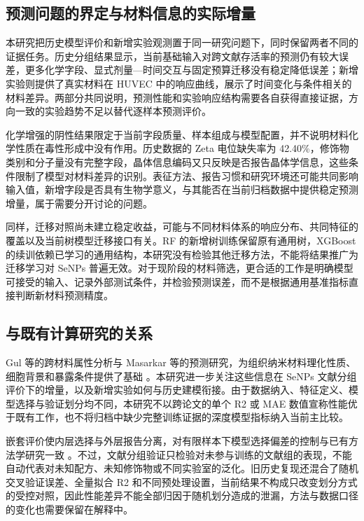 \subsection{预测问题的界定与材料信息的实际增量}

本研究把历史模型评价和新增实验观测置于同一研究问题下，同时保留两者不同的证据任务。历史分组结果显示，当前基础输入对跨文献存活率的预测仍有较大误差，更多化学字段、显式剂量—时间交互与固定预算迁移没有稳定降低误差；新增实验则提供了真实材料在 HUVEC 中的响应曲线，展示了时间变化与条件相关的材料差异。两部分共同说明，预测性能和实验响应结构需要各自获得直接证据，方向一致的实验趋势不足以替代逐样本预测评价。

化学增强的阴性结果限定于当前字段质量、样本组成与模型配置，并不说明材料化学性质在毒性形成中没有作用。历史数据的 Zeta 电位缺失率为 42.40\%，修饰物类别和分子量没有完整字段，晶体信息编码又只反映是否报告晶体学信息，这些条件限制了模型对材料差异的识别。表征方法、报告习惯和研究环境还可能共同影响输入值，新增字段是否具有生物学意义，与其能否在当前归档数据中提供稳定预测增量，属于需要分开讨论的问题。

同样，迁移对照尚未建立稳定收益，可能与不同材料体系的响应分布、共同特征的覆盖以及当前树模型迁移接口有关。RF 的新增树训练保留原有通用树，XGBoost 的续训依赖已学习的通用结构，本研究没有检验其他迁移方法，不能将结果推广为迁移学习对 SeNPs 普遍无效。对于现阶段的材料筛选，更合适的工作是明确模型可接受的输入、记录外部测试条件，并检验预测误差，而不是根据通用基准指标直接判断新材料预测精度。

\subsection{与既有计算研究的关系}

Gul 等的跨材料属性分析与 Masarkar 等的预测研究，为组织纳米材料理化性质、细胞背景和暴露条件提供了基础 \cite{gul2021association,masarkar2024}。本研究进一步关注这些信息在 SeNPs 文献分组评价下的增量，以及新增实验如何与历史建模衔接。由于数据纳入、特征定义、模型选择与验证划分均不同，本研究不以跨论文的单个 R2 或 MAE 数值宣称性能优于既有工作，也不将归档中缺少完整训练证据的深度模型指标纳入当前主比较。

嵌套评价使内层选择与外层报告分离，对有限样本下模型选择偏差的控制与已有方法学研究一致 \cite{cawley2010selection}。不过，文献分组验证只检验对未参与训练的文献组的表现，不能自动代表对未知配方、未知修饰物或不同实验室的泛化。旧历史复现还混合了随机交叉验证误差、全量拟合 R2 和不同预处理设置，当前结果不构成只改变划分方式的受控对照，因此性能差异不能全部归因于随机划分造成的泄漏，方法与数据口径的变化也需要保留在解释中。


